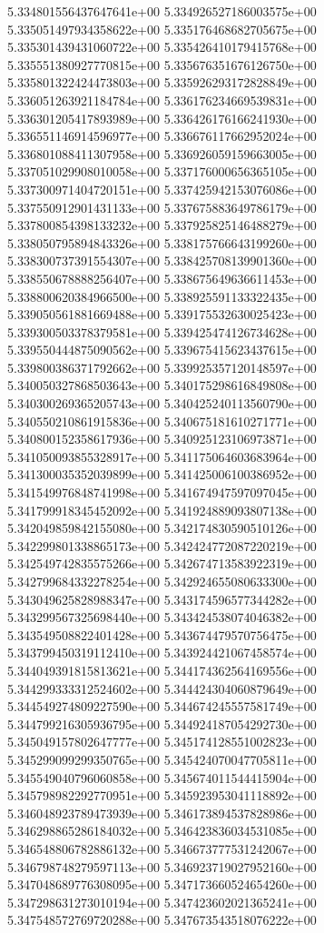 5.334801556437647641e+00
5.334926527186003575e+00
5.335051497934358622e+00
5.335176468682705675e+00
5.335301439431060722e+00
5.335426410179415768e+00
5.335551380927770815e+00
5.335676351676126750e+00
5.335801322424473803e+00
5.335926293172828849e+00
5.336051263921184784e+00
5.336176234669539831e+00
5.336301205417893989e+00
5.336426176166241930e+00
5.336551146914596977e+00
5.336676117662952024e+00
5.336801088411307958e+00
5.336926059159663005e+00
5.337051029908010058e+00
5.337176000656365105e+00
5.337300971404720151e+00
5.337425942153076086e+00
5.337550912901431133e+00
5.337675883649786179e+00
5.337800854398133232e+00
5.337925825146488279e+00
5.338050795894843326e+00
5.338175766643199260e+00
5.338300737391554307e+00
5.338425708139901360e+00
5.338550678888256407e+00
5.338675649636611453e+00
5.338800620384966500e+00
5.338925591133322435e+00
5.339050561881669488e+00
5.339175532630025423e+00
5.339300503378379581e+00
5.339425474126734628e+00
5.339550444875090562e+00
5.339675415623437615e+00
5.339800386371792662e+00
5.339925357120148597e+00
5.340050327868503643e+00
5.340175298616849808e+00
5.340300269365205743e+00
5.340425240113560790e+00
5.340550210861915836e+00
5.340675181610271771e+00
5.340800152358617936e+00
5.340925123106973871e+00
5.341050093855328917e+00
5.341175064603683964e+00
5.341300035352039899e+00
5.341425006100386952e+00
5.341549976848741998e+00
5.341674947597097045e+00
5.341799918345452092e+00
5.341924889093807138e+00
5.342049859842155080e+00
5.342174830590510126e+00
5.342299801338865173e+00
5.342424772087220219e+00
5.342549742835575266e+00
5.342674713583922319e+00
5.342799684332278254e+00
5.342924655080633300e+00
5.343049625828988347e+00
5.343174596577344282e+00
5.343299567325698440e+00
5.343424538074046382e+00
5.343549508822401428e+00
5.343674479570756475e+00
5.343799450319112410e+00
5.343924421067458574e+00
5.344049391815813621e+00
5.344174362564169556e+00
5.344299333312524602e+00
5.344424304060879649e+00
5.344549274809227590e+00
5.344674245557581749e+00
5.344799216305936795e+00
5.344924187054292730e+00
5.345049157802647777e+00
5.345174128551002823e+00
5.345299099299350765e+00
5.345424070047705811e+00
5.345549040796060858e+00
5.345674011544415904e+00
5.345798982292770951e+00
5.345923953041118892e+00
5.346048923789473939e+00
5.346173894537828986e+00
5.346298865286184032e+00
5.346423836034531085e+00
5.346548806782886132e+00
5.346673777531242067e+00
5.346798748279597113e+00
5.346923719027952160e+00
5.347048689776308095e+00
5.347173660524654260e+00
5.347298631273010194e+00
5.347423602021365241e+00
5.347548572769720288e+00
5.347673543518076222e+00
